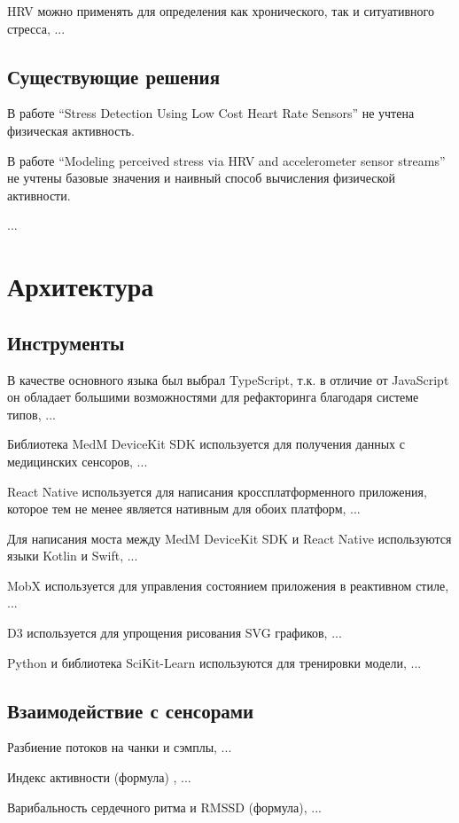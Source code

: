 \documentclass[14pt]{matmex-diploma-custom}
\begin{document}
HRV можно применять для определения как хронического, так и ситуативного
стресса, ...

\subsection{Существующие решения}

В работе ``Stress Detection Using Low Cost Heart Rate Sensors''
\cite{article:cheap_hrm} не учтена физическая активность.

В работе ``Modeling perceived stress via HRV and accelerometer sensor streams''
\cite{article:accelerometer_hrv} не учтены базовые значения и наивный способ
вычисления физической активности.

...

\section{Архитектура}
\subsection{Инструменты}
В качестве основного языка был выбрал TypeScript, т.к. в отличие от JavaScript
он обладает большими возможностями для рефакторинга благодаря системе типов, ...

Библиотека MedM DeviceKit SDK используется для получения данных с медицинских
сенсоров, ...

React Native используется для написания кроссплатформенного приложения, которое
тем не менее является нативным для обоих платформ, ...

Для написания моста между MedM DeviceKit SDK и React Native используются языки
Kotlin и Swift, ...

MobX используется для управления состоянием приложения в реактивном стиле, ...

D3 используется для упрощения рисования SVG графиков, ...

Python и библиотека SciKit-Learn используются для тренировки модели, ...

\subsection{Взаимодействие с сенсорами}
Разбиение потоков на чанки и сэмплы, ...

Индекс активности (формула) \cite{article:activity_index}, ...

Варибальность сердечного ритма и RMSSD (формула), ...
\end{document}
